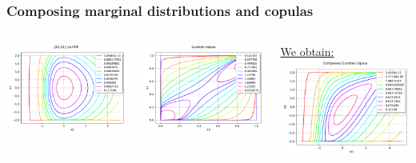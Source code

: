 \documentclass[aspectratio=169]{beamer}
\begin{document}
\begin{frame}[containsverbatim]
\frametitle{Composing marginal distributions and copulas}

\begin{columns}

\begin{minipage}[t]{1.\textwidth}
    \includegraphics[width=.6\textwidth]{figures/Dist.pdf}

\end{minipage}

\begin{minipage}[t]{1.\textwidth}
    \includegraphics[width=.6\textwidth]{figures/Copula4.pdf}

\end{minipage}


\underline{We obtain:}
    \includegraphics[width=.9\textwidth]{figures/ComposedGumbel.pdf}
    



\end{columns}
\end{frame}
\end{document}

